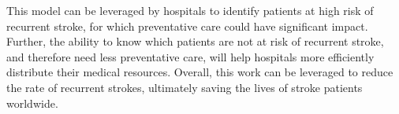 \documentclass{article}
\begin{document}
This model can be leveraged by hospitals to identify patients at high risk of recurrent stroke, for which preventative care could have significant impact. Further, the ability to know which patients are not at risk of recurrent stroke, and therefore need less preventative care, will help hospitals more efficiently distribute their medical resources. Overall, this work can be leveraged to reduce the rate of recurrent strokes, ultimately saving the lives of stroke patients worldwide.



\end{document}
